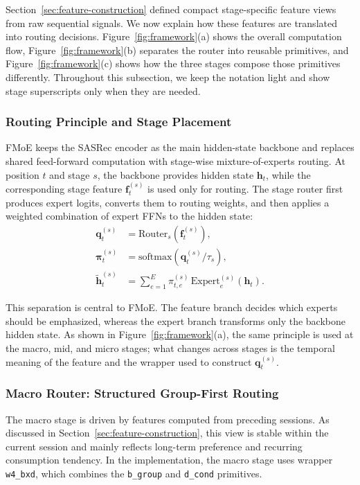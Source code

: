 \documentclass[sigconf,authordraft]{acmart}
\begin{document}
Section~\ref{sec:feature-construction} defined compact stage-specific feature views from raw sequential signals. We now explain how these features are translated into routing decisions. Figure~\ref{fig:framework}(a) shows the overall computation flow, Figure~\ref{fig:framework}(b) separates the router into reusable primitives, and Figure~\ref{fig:framework}(c) shows how the three stages compose those primitives differently. Throughout this subsection, we keep the notation light and show stage superscripts only when they are needed.

\subsubsection{Routing Principle and Stage Placement}

FMoE keeps the SASRec encoder as the main hidden-state backbone and replaces shared feed-forward computation with stage-wise mixture-of-experts routing. At position $t$ and stage $s$, the backbone provides hidden state $\mathbf{h}_t$, while the corresponding stage feature $\mathbf{f}^{(s)}_t$ is used only for routing. The stage router first produces expert logits, converts them to routing weights, and then applies a weighted combination of expert FFNs to the hidden state:
\begin{align}
\mathbf{q}^{(s)}_t &= \mathrm{Router}_s(\mathbf{f}^{(s)}_t), \\
\boldsymbol{\pi}^{(s)}_t &= \mathrm{softmax}\!\left(\mathbf{q}^{(s)}_t / \tau_s\right), \\
\tilde{\mathbf{h}}^{(s)}_t &= \sum_{e=1}^{E} \pi^{(s)}_{t,e}\,\mathrm{Expert}^{(s)}_e(\mathbf{h}_t).
\end{align}

This separation is central to FMoE. The feature branch decides which experts should be emphasized, whereas the expert branch transforms only the backbone hidden state. As shown in Figure~\ref{fig:framework}(a), the same principle is used at the macro, mid, and micro stages; what changes across stages is the temporal meaning of the feature and the wrapper used to construct $\mathbf{q}^{(s)}_t$.

\subsubsection{Macro Router: Structured Group-First Routing}

The macro stage is driven by features computed from preceding sessions. As discussed in Section~\ref{sec:feature-construction}, this view is stable within the current session and mainly reflects long-term preference and recurring consumption tendency. In the implementation, the macro stage uses wrapper \texttt{w4\_bxd}, which combines the \texttt{b\_group} and \texttt{d\_cond} primitives.
\end{document}
